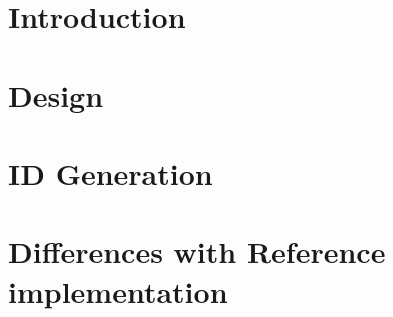 \documentclass[11pt,a4paper]{article}
\begin{document}



%
%
\vspace{20pt}
\section{Introduction}
\label{sec:introduction}

\pagebreak

%
%
\section{Design}
\label{sec:design}

\pagebreak


%
%
\section{ID Generation}
\label{sec:id_generation}

\pagebreak

%
\section{Differences with Reference implementation}
\label{sec:differences}

\pagebreak
\end{document}

